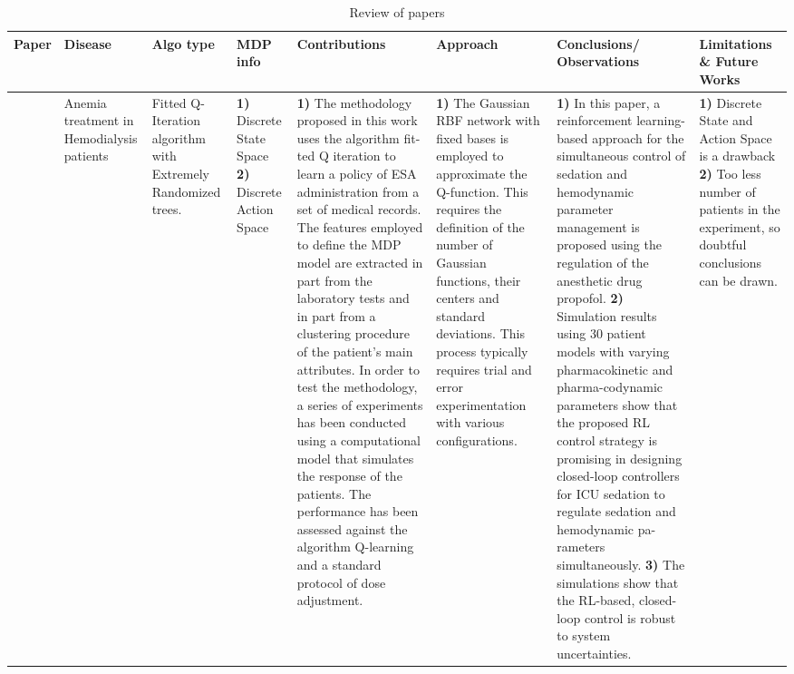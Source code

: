 \begin{table}[!th]
\caption{Review of papers}
\label{tab:review8}
\begin{tabular}{|p{3 em}|p{3 em}|p{3 em}|p{3em}|p{6em}|p{6em}|p{6 em}|p{9em}|}
\toprule
Paper  & Disease  & Algo type & MDP info & Contributions  & Approach & Conclusions/ Observations  & Limitations \& Future Works \\
\hline
\citet{DBLP:journals/artmed/Escandell-MonteroCMGBSMVSGM14} &  Anemia treatment in Hemodialysis patients
& 
Fitted Q-Iteration algorithm with Extremely Randomized trees.
& 
\textbf{1)} Discrete State Space 
\textbf{2)} Discrete Action Space 
&  
\textbf{1)} The methodology proposed in this work uses the algorithm fit-
ted Q iteration to learn a policy of ESA administration from a set of medical records. The features employed to define the MDP model
are extracted in part from the laboratory tests and in part from a
clustering procedure of the patient’s main attributes. In order to
test the methodology, a series of experiments has been conducted
using a computational model that simulates the response of the
patients. The performance has been assessed against the algorithm
Q-learning and a standard protocol of dose adjustment.
&
\textbf{1)} The Gaussian RBF network with fixed bases is employed to approximate the Q-function. This requires the definition of the number of
Gaussian functions, their centers and standard deviations. This process typically requires trial and error experimentation with various configurations. 
& 
\textbf{1)} In this paper, a reinforcement learning-based approach
for the simultaneous control of sedation and hemodynamic
parameter management is proposed using the regulation of
the anesthetic drug propofol. 
\textbf{2)} Simulation results using 30 patient models with varying pharmacokinetic and pharma-codynamic parameters show that the proposed RL control strategy is promising in designing closed-loop controllers for ICU sedation to regulate sedation and hemodynamic pa-
rameters simultaneously. \textbf{3)} The simulations show
that the RL-based, closed-loop control is robust to system
uncertainties. 
& 
\textbf{1)}  Discrete State and Action Space is a drawback
\textbf{2)} Too less number of patients in the experiment, so doubtful conclusions can be drawn.
   \\\midrule
\end{tabular}
\vspace*{-2em}
\end{table}   



